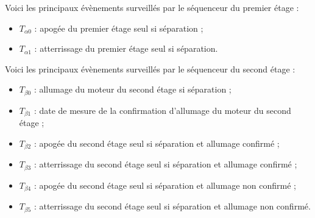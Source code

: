 \newpage

Voici les principaux évènements surveillés par le séquenceur du premier étage :
\begin{itemize}
    \item $T_{\alpha0}$ : apogée du premier étage seul si séparation ;
    \item $T_{\alpha1}$ : atterrissage du premier étage seul si séparation.\\
\end{itemize}

Voici les principaux évènements surveillés par le séquenceur du second étage :
\begin{itemize}
    \item $T_{\beta0}$ : allumage du moteur du second étage si séparation ;
    \item $T_{\beta1}$ : date de mesure de la confirmation d’allumage du moteur du second étage ;
    \item $T_{\beta2}$ : apogée du second étage seul si séparation et allumage confirmé ;
    \item $T_{\beta3}$ : atterrissage du second étage seul si séparation et allumage confirmé ;
    \item $T_{\beta4}$ : apogée du second étage seul si séparation et allumage non confirmé ;
    \item $T_{\beta5}$ : atterrissage du second étage seul si séparation et allumage non confirmé.\\
\end{itemize}

\newpage
